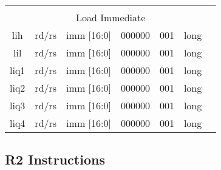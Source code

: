 \documentclass{article}
\begin{document}
\begin{center}
\begin{longtable}{|c|l|r|l|r|l|r|l|r|c|c|}
    
    \hline          \multicolumn{11}{|c|}{} \\
    
                    \multicolumn{11}{|c|}{Load Immediate} \\
    \hline lih  &   \multicolumn{2}{|c|}{rd/rs} &   \multicolumn{2}{|c|}{imm [16:0]}    &   \multicolumn{2}{|c|}{000000}    &   \multicolumn{2}{|c|}{001}   &   long    & \\
    \hline lil  &   \multicolumn{2}{|c|}{rd/rs} &   \multicolumn{2}{|c|}{imm [16:0]}    &   \multicolumn{2}{|c|}{000000}    &   \multicolumn{2}{|c|}{001}   &   long    & \\
    \hline liq1 &   \multicolumn{2}{|c|}{rd/rs} &   \multicolumn{2}{|c|}{imm [16:0]}    &   \multicolumn{2}{|c|}{000000}    &   \multicolumn{2}{|c|}{001}   &   long    & \\
    \hline liq2 &   \multicolumn{2}{|c|}{rd/rs} &   \multicolumn{2}{|c|}{imm [16:0]}    &   \multicolumn{2}{|c|}{000000}    &   \multicolumn{2}{|c|}{001}   &   long    & \\
    \hline liq3 &   \multicolumn{2}{|c|}{rd/rs} &   \multicolumn{2}{|c|}{imm [16:0]}    &   \multicolumn{2}{|c|}{000000}    &   \multicolumn{2}{|c|}{001}   &   long    & \\
    \hline liq4 &   \multicolumn{2}{|c|}{rd/rs} &   \multicolumn{2}{|c|}{imm [16:0]}    &   \multicolumn{2}{|c|}{000000}    &   \multicolumn{2}{|c|}{001}   &   long    & \\
    
    
    \hline
    \end{longtable}
    \end{center}
        
    
    \subsection{R2 Instructions}
    
\end{document}
